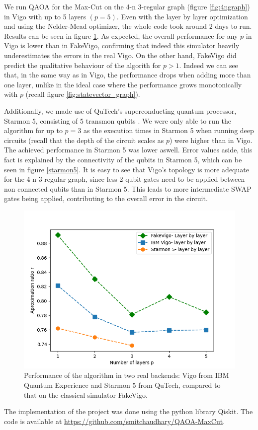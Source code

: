 We run QAOA for the Max-Cut on the 4-n 3-regular graph (figure \ref{fig:4ngraph}) in Vigo with up to 5 layers $(p=5)$. Even with the layer by layer optimization and using the Nelder-Mead optimizer, the whole code took around 2 days to run. Results can be seen in figure \ref{real_backend}. As expected, the overall performance for any $p$ in Vigo is lower than in FakeVigo, confirming that indeed this simulator heavily underestimates the errors in the real Vigo. On the other hand, FakeVigo did predict the qualitative behaviour of the algorith for $p>1$. Indeed we can see that, in the same way as in Vigo, the performance drops when adding more than one layer, unlike in the ideal case where the performance grows monotonically with $p$ (recall figure \ref{fig:statevector_graph}).


Additionally, we made use of QuTech's superconducting quantum processor, Starmon 5, consisting of 5 transmon qubits \cite{starmon_ref}. We were only able to run the algorithm for up to $p=3$ as the execution times in Starmon 5 when running deep circuits (recall that the depth of the circuit scales as $p$) were higher than in Vigo. The achieved performance in Starmon 5 was lower aswell. Error values aside, this fact is explained by the connectivity of the qubits in Starmon 5, which can be seen in figure \ref{starmon5}. It is easy to see that Vigo's topology is more adequate for the 4-n 3-regular graph, since less 2-qubit gates need to be applied between non connected qubits than in Starmon 5. This leads to more intermediate SWAP gates being applied, contributing to the overall error in the circuit. 


\begin{figure}
    \centering
    \includegraphics[width=0.6\linewidth]{images/starmon5 and vigo.png}    
    \caption{Performance of the algorithm in two real backends: Vigo from IBM Quantum Experience and Starmon 5 from QuTech, compared to that on the classical simulator FakeVigo.}
    \label{real_backend}
\end{figure}
The implementation of the project was done using the python library Qiskit. The code is available at \url{https://github.com/smitchaudhary/QAOA-MaxCut}.
